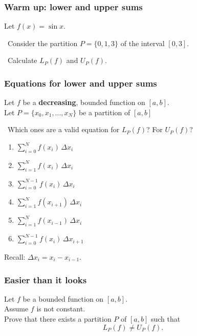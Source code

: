 \documentclass[14pt]{beamer}
\newcommand{\setsize}[1]{\fontsize{#1}{#1}\selectfont} %
\newcommand{\smallerfont}{\setsize{13}} %
\begin{document}
	\begin{frame}[t]
		\frametitle{Warm up: lower and upper sums}

		Let ${\displaystyle f(x) = \sin x}$.

		\
 Consider the partition ${\displaystyle P= \{0, 1, 3\}}$ of the interval
		${\displaystyle [0,3]}$.

		\
 Calculate ${\displaystyle L_P(f)}$ and ${\displaystyle U_P(f)}$.
	\end{frame}

	\begin{frame}[t]
		\smallerfont
		\frametitle{Equations for lower and upper sums}

		Let $f$ be a {\bf decreasing}, bounded function on $[a,b]$. \\ Let
		${\displaystyle P = \{x_0, x_1, \ldots, x_N\}}$ be a partition of $[a,b]$

		\
 Which ones are a valid equation for $L_{P}(f)$? For $U_{P}(f)$?

		\begin{multicols}{3}
			\begin{enumerate}
				\item ${\displaystyle \sum_{i=0}^N f(x_i) \, \Delta x_i}$

				\item ${\displaystyle \sum_{i = 1}^N f(x_i) \, \Delta x_i}$

				\item ${\displaystyle \sum_{i = 0}^{N-1} f(x_i) \, \Delta x_i}$

				\item ${\displaystyle \sum_{i = 1}^N f(x_{i+1}) \, \Delta x_i}$

				\item ${\displaystyle \sum_{i = 1}^N f(x_{i-1}) \, \Delta x_i}$

				\item ${\displaystyle \sum_{i = 0}^{N-1} f(x_{i}) \, \Delta x_{i+1}}$
			\end{enumerate}
		\end{multicols}

		Recall: ${\displaystyle \Delta x_i = x_i - x_{i-1}}$.
	\end{frame}
	\begin{frame}[t]
		\frametitle{Easier than it looks}

		Let $f$ be a bounded function on $[a,b]$. \\ Assume $f$ is not constant. \\
		Prove that there exists a partition $P$ of $[a,b]$ such that
		\[
			L_{P}(f) \neq U_{P}(f).
		\]
	\end{frame}
\end{document}
